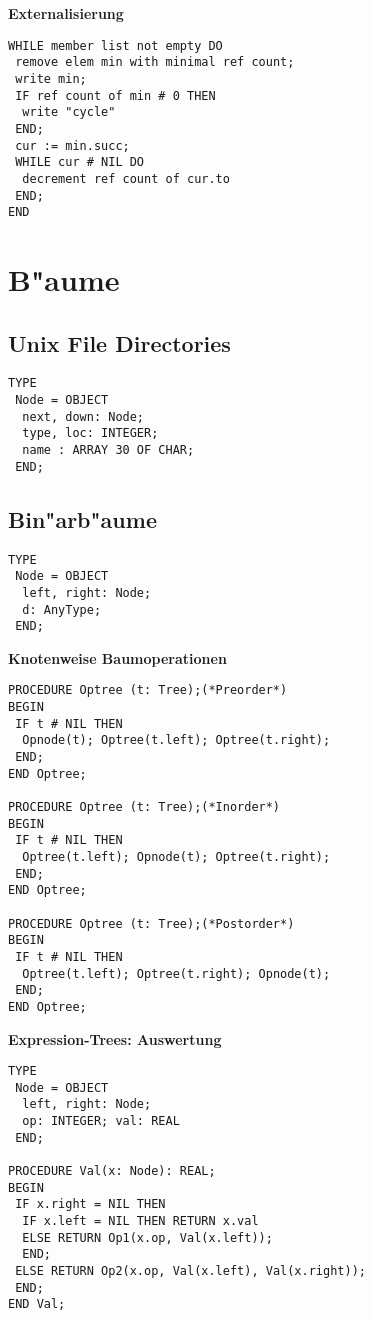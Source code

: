 \documentclass[10pt, a4paper, twocolumn]{scrartcl}
\begin{document}
{\bf Externalisierung}
\begin{verbatim}
WHILE member list not empty DO
 remove elem min with minimal ref count;
 write min;
 IF ref count of min # 0 THEN
  write "cycle"
 END;
 cur := min.succ;
 WHILE cur # NIL DO
  decrement ref count of cur.to
 END;
END
\end{verbatim}

\section{B"aume}

\subsection{Unix File Directories}

\begin{verbatim}
TYPE
 Node = OBJECT
  next, down: Node;
  type, loc: INTEGER;
  name : ARRAY 30 OF CHAR;
 END;
\end{verbatim}


\subsection{Bin"arb"aume}

\begin{verbatim}
TYPE
 Node = OBJECT
  left, right: Node;
  d: AnyType;
 END;
\end{verbatim}

{\bf Knotenweise Baumoperationen}
\begin{verbatim}
PROCEDURE Optree (t: Tree);(*Preorder*)
BEGIN
 IF t # NIL THEN
  Opnode(t); Optree(t.left); Optree(t.right);
 END;
END Optree;

PROCEDURE Optree (t: Tree);(*Inorder*)
BEGIN
 IF t # NIL THEN
  Optree(t.left); Opnode(t); Optree(t.right);
 END;
END Optree;

PROCEDURE Optree (t: Tree);(*Postorder*)
BEGIN
 IF t # NIL THEN
  Optree(t.left); Optree(t.right); Opnode(t);
 END;
END Optree;
\end{verbatim}


{\bf Expression-Trees: Auswertung}

\begin{verbatim}
TYPE
 Node = OBJECT
  left, right: Node;
  op: INTEGER; val: REAL
 END;

PROCEDURE Val(x: Node): REAL;
BEGIN
 IF x.right = NIL THEN
  IF x.left = NIL THEN RETURN x.val
  ELSE RETURN Op1(x.op, Val(x.left));
  END;
 ELSE RETURN Op2(x.op, Val(x.left), Val(x.right));
 END;
END Val;
\end{verbatim}
\end{document}
